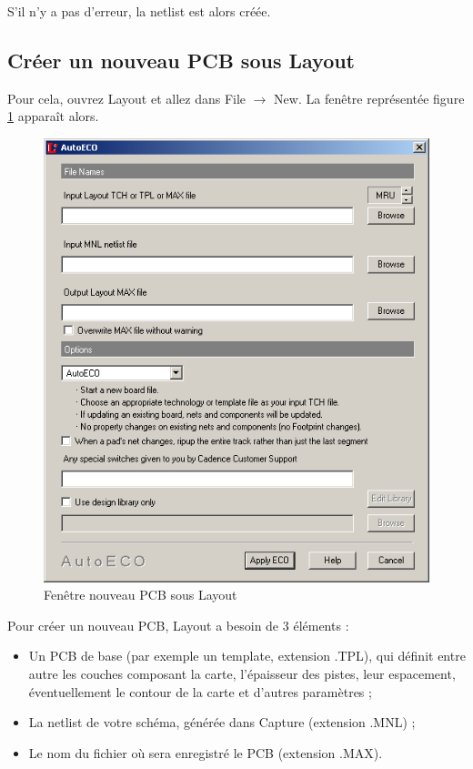 \documentclass[a4paper]{article}
\begin{document}
S'il n'y a pas d'erreur, la netlist est alors créée.

\subsection{Créer un nouveau PCB sous Layout}

Pour cela, ouvrez Layout et allez dans \og{}File\fg{} $\rightarrow$ \og{}New\fg{}. La fenêtre représentée figure \ref{Nouveau_PCB_Layout} apparaît alors.

\begin{figure}[H]
	\centering
	\includegraphics[scale=0.75]{Images/Nouveau_PCB_Layout.png}
	\caption{Fenêtre nouveau PCB sous Layout
		\label{Nouveau_PCB_Layout}}
\end{figure}

Pour créer un nouveau PCB, Layout a besoin de 3 éléments :

\begin{itemize}
	\item Un PCB de base (par exemple un \og{}template\fg{}, extension \og{}.TPL\fg{}), qui définit entre autre les couches composant la carte, l'épaisseur des pistes, leur espacement, éventuellement le contour de la carte et d'autres paramètres ;
	\item La netlist de votre schéma, générée dans Capture (extension \og{}.MNL\fg{}) ;
	\item Le nom du fichier où sera enregistré le PCB (extension \og{}.MAX\fg{}).
\end{itemize}
\end{document}
